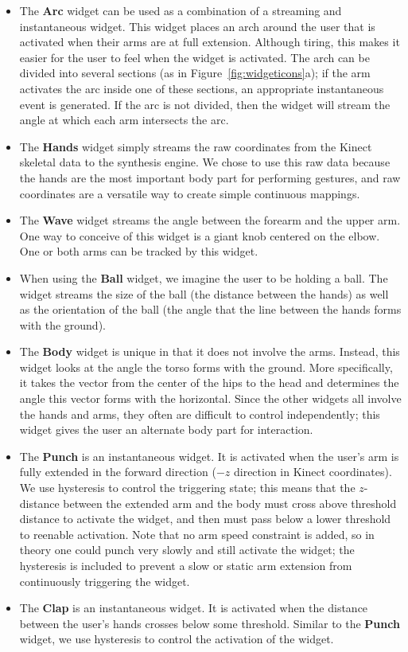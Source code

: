 \documentclass{nime-alternate}
\begin{document}
\begin{itemize}
\item The \textbf{Arc} widget can be used as a combination of a streaming and instantaneous widget.
This widget places an arch around the user that is 
activated when their arms are at full extension. Although tiring, this makes it easier for the 
user to feel when the widget is activated. The arch can be divided into several sections (as in
Figure~\ref{fig:widgeticons}a); if the arm activates the arc inside one of these sections, an
appropriate instantaneous event is generated. If the arc is not divided, then the widget will
stream the angle at which each arm intersects the arc.
\item The \textbf{Hands} widget simply streams the raw coordinates from the Kinect skeletal 
data to the synthesis engine. We chose to use this raw data because the hands are the
most important body part for performing gestures, and raw coordinates are a versatile way to
create simple continuous mappings.
\item The \textbf{Wave} widget streams the angle between the forearm and the upper arm. One
way to conceive of this widget is a giant knob centered on the elbow. One or both arms can
be tracked by this widget.
\item When using the \textbf{Ball} widget, we imagine the user to be holding a ball. The widget streams
the size of the ball (the distance between the hands) as well as the orientation of the ball
(the angle that the line between the hands forms with the ground).
\item The \textbf{Body} widget is unique in that it does not involve the arms. Instead, this
widget looks at the angle the torso forms with the ground. More specifically, it takes the
vector from the center of the hips to the head and determines the angle this vector forms
with the horizontal. Since the other widgets all involve the hands and arms, they often
are difficult to control independently; this widget gives the user an alternate body part for interaction.
\item The \textbf{Punch} is an instantaneous widget. It is activated when the user's arm is
fully extended in the forward direction ($-z$ direction in Kinect coordinates). We use hysteresis to control the triggering state; this means that the $z$-distance
between the extended arm and the body must cross above threshold
distance to activate the widget, and then must pass below a lower threshold to reenable
activation. Note that no arm speed constraint is added, so in theory one could punch
very slowly and still activate the widget; the hysteresis is included to prevent a slow or 
static arm extension from continuously triggering the widget.
\item The \textbf{Clap} is an instantaneous widget. It is activated when the distance
between the user's hands crosses below some threshold. Similar to the \textbf{Punch} widget,
we use hysteresis to control the activation of the widget.
\end{itemize}
\end{document}
